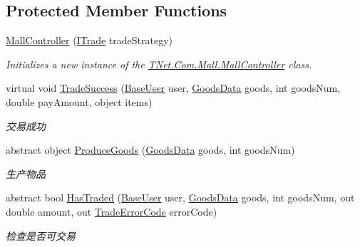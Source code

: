 \subsection*{Protected Member Functions}
\begin{DoxyCompactItemize}
\item 
\mbox{\hyperlink{class_t_net_1_1_com_1_1_mall_1_1_mall_controller_ac450c5bdf31251e38f119be0cdf24358}{Mall\+Controller}} (\mbox{\hyperlink{interface_t_net_1_1_com_1_1_mall_1_1_i_trade}{I\+Trade}} trade\+Strategy)
\begin{DoxyCompactList}\small\item\em Initializes a new instance of the \mbox{\hyperlink{class_t_net_1_1_com_1_1_mall_1_1_mall_controller}{T\+Net.\+Com.\+Mall.\+Mall\+Controller}} class. \end{DoxyCompactList}\item 
virtual void \mbox{\hyperlink{class_t_net_1_1_com_1_1_mall_1_1_mall_controller_ae629794a89e165653eb59684d8008231}{Trade\+Success}} (\mbox{\hyperlink{class_t_net_1_1_context___1_1_base_user}{Base\+User}} user, \mbox{\hyperlink{class_t_net_1_1_com_1_1_model_1_1_goods_data}{Goods\+Data}} goods, int goods\+Num, double pay\+Amount, object items)
\begin{DoxyCompactList}\small\item\em 交易成功 \end{DoxyCompactList}\item 
abstract object \mbox{\hyperlink{class_t_net_1_1_com_1_1_mall_1_1_mall_controller_a1efdfb3c460fb04a007732ae3610bbfa}{Produce\+Goods}} (\mbox{\hyperlink{class_t_net_1_1_com_1_1_model_1_1_goods_data}{Goods\+Data}} goods, int goods\+Num)
\begin{DoxyCompactList}\small\item\em 生产物品 \end{DoxyCompactList}\item 
abstract bool \mbox{\hyperlink{class_t_net_1_1_com_1_1_mall_1_1_mall_controller_ac3b0d39cba36e863413c9e192f6e98a5}{Has\+Traded}} (\mbox{\hyperlink{class_t_net_1_1_context___1_1_base_user}{Base\+User}} user, \mbox{\hyperlink{class_t_net_1_1_com_1_1_model_1_1_goods_data}{Goods\+Data}} goods, int goods\+Num, out double amount, out \mbox{\hyperlink{namespace_t_net_1_1_com_1_1_mall_a8ed58f71da1d1495830104612fc5667a}{Trade\+Error\+Code}} error\+Code)
\begin{DoxyCompactList}\small\item\em 检查是否可交易 \end{DoxyCompactList}\item 

\end{DoxyCompactItemize}
